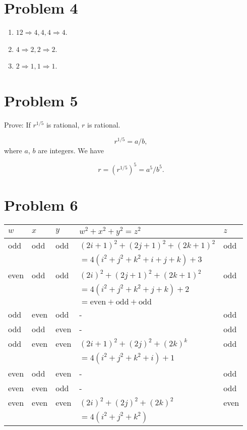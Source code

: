 \documentclass[12pt]{article}
\begin{document}
\section*{Problem 4}
\begin{enumerate}
    \item $12 \Rightarrow 4, 4, 4 \Rightarrow 4$.
    \item $4 \Rightarrow 2, 2 \Rightarrow 2$.
    \item $2 \Rightarrow 1, 1 \Rightarrow 1$.
\end{enumerate}

\section*{Problem 5}
Prove: If $r^{1/5}$ is rational, $r$ is rational.

$$r^{1 / 5} = a / b,$$
 where $a$, $b$ are integers. We have

 $$r = \left( r^{1 / 5} \right)^5 = a^5 / b^5 .$$

 \section*{Problem 6}
\begin{center}
\begin{tabular}{lllll}
    \toprule
    $w$ & $x$ & $y$ & $w^2 + x^2 + y^2 = z^2$ & $z$\\
    \midrule
    odd & odd & odd & $\left(2i + 1 \right)^2 + \left( 2j + 1 \right)^2 + \left( 2k + 1 \right)^2$ & odd\\
        &&& $= 4\left( i^2 + j^2 + k^2 + i + j + k \right) + 3 $ & \\
    even & odd & odd & $\left(2i\right)^2 + \left( 2j + 1 \right)^2 + \left( 2k + 1 \right)^2$ & odd\\
         &&& $=4\left( i^2 + j^2 + k^2 + j + k \right) + 2 $ &\\
         &&& $=\text{even} + \text{odd} + \text{odd}$ &\\
    odd & even & odd & - & odd\\
    odd & odd & even & - & odd\\
    odd & even & even & $\left( 2i + 1 \right)^2 + \left( 2j \right)^2 + \left( 2k \right)^k  $  & odd\\
        &&& $=4\left(i^2 + j^2 + k^2 + i \right) + 1 $ &\\
    even & odd & even & - & odd\\
    even & even & odd & - & odd\\
    even & even & even & $\left( 2i \right)^2 + \left( 2j \right)^2 + \left( 2k \right)^2$ & even\\
         &&& $= 4\left( i^2 + j^2 + k^2 \right) $ &\\
    \bottomrule
\end{tabular}
\end{center}
\end{document}
